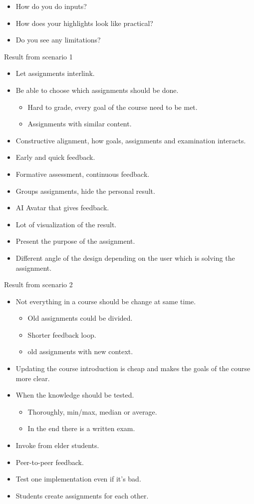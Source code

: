 \begin{itemize}
\item How do you do inputs?
\item How does your highlights look like practical?
\item Do you see any limitations?
\end{itemize} 



Result from scenario 1
\begin{itemize}
\item Let assignments interlink.
\item Be able to choose which assignments should be done.
    \begin{itemize}
    \item Hard to grade, every goal of the course need to be met.
    \item Assignments with similar content.
    \end{itemize}
\item Constructive alignment, how goals, assignments and examination interacts.
\item Early and quick feedback.
\item Formative assessment, continuous feedback.
\item Groups assignments, hide the personal result.
\item AI Avatar that gives feedback.
\item Lot of visualization of the result.
\item Present the purpose of the assignment.
\item Different angle of the design depending on the user which is solving the assignment.
\end{itemize}

Result from scenario 2
\begin{itemize}
\item Not everything in a course should be change at same time.
\begin{itemize}
\item Old assignments could be divided.
\item Shorter feedback loop.
\item old assignments with new context.
\end{itemize}
\item Updating the course introduction is cheap and makes the goals of the course more clear.
\item When the knowledge should be tested.
\begin{itemize}
\item Thoroughly, min/max, median or average.
\item In the end there is a written exam.
\end{itemize}
\item Invoke from elder students.
\item Peer-to-peer feedback.
\item Test one implementation even if it's bad.
\item Students create assignments for each other.
\end{itemize}

